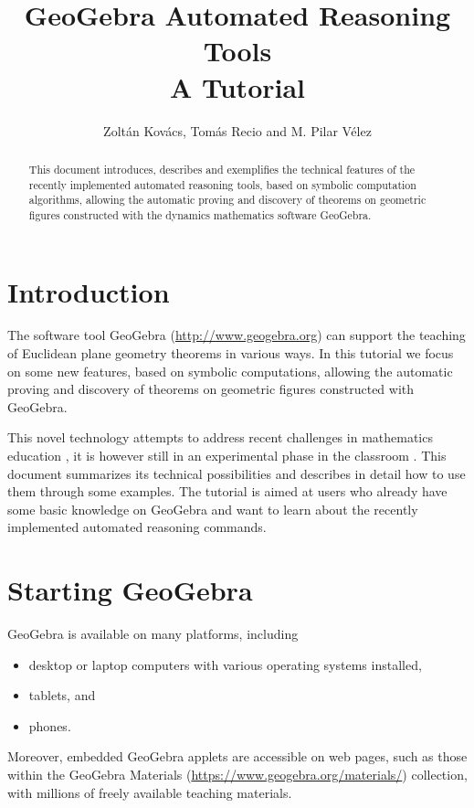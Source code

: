 \documentclass{article}
\title{GeoGebra Automated Reasoning Tools\\ \large A Tutorial}
\author{Zolt\'an Kov\'acs, Tom\'as Recio and M. Pilar V\'elez}
\begin{document}


\maketitle

\begin{abstract}
This document introduces, describes and exemplifies the technical
features of the recently implemented automated reasoning tools, based
on symbolic computation algorithms, allowing the automatic proving and
discovery of theorems on geometric figures constructed with the dynamics
mathematics software GeoGebra.
\end{abstract}


\section{Introduction}

The software tool GeoGebra (\url{http://www.geogebra.org}) can support the teaching of Euclidean plane geometry theorems in various ways. In this tutorial we focus on some new features, based on symbolic computations,  allowing the automatic proving and discovery of theorems on geometric figures constructed with GeoGebra.

This novel technology attempts to address recent challenges
in mathematics education \cite{HowsonWilson,Davis,SinclairBartoliniBussiDeVilliersOwens,Quaresma,RichardOllerMeavilla},
it is however still in an experimental phase in the classroom \cite{KovacsRecioRichardVelez,Kovacs2017}.
This document summarizes its technical possibilities and describes in detail how to use them through some examples. The tutorial is aimed at users who already
have some basic knowledge on GeoGebra and want to learn about the recently implemented automated reasoning commands.

\section{Starting GeoGebra}

GeoGebra is available on many platforms, including
\begin{itemize}
    \item desktop or laptop computers with various operating systems installed,
    \item tablets, and
    \item phones.
\end{itemize}
Moreover, embedded GeoGebra applets are accessible on web pages, such as those within the GeoGebra Materials (\url{https://www.geogebra.org/materials/}) collection, with millions of freely available teaching materials.
\end{document}
